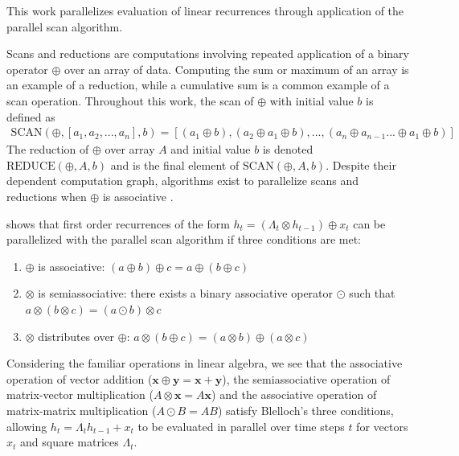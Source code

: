 \documentclass{article}
\providecommand{\scan}{\text{SCAN}}
\providecommand{\reduce}{\text{REDUCE}}
\begin{document}
  This work parallelizes evaluation of linear recurrences through application of
the parallel scan algorithm.

Scans and reductions are computations involving repeated application of a binary
operator $\oplus$ over an array of data. Computing the sum or maximum
of an array is an example of a reduction, while a cumulative sum is a common
example of a scan operation. Throughout this work, the scan of $\oplus$ with
initial value $b$ is defined as
\begin{align*}
\scan(\oplus, [a_1, a_2, ..., a_n], b) = [(a_1 \oplus b), (a_2 \oplus a_1 \oplus b), ..., (a_n \oplus a_{n-1} ... \oplus a_1 \oplus b)]
\end{align*}
The reduction of $\oplus$ over array $A$ and initial value $b$ is denoted 
$\reduce(\oplus, A, b)$ and is the final element of $\scan(\oplus, A, b)$.
Despite their dependent computation graph, algorithms exist to parallelize scans 
and reductions when $\oplus$ is associative \cite{ladner1980parallel}.

\citet{blelloch1990prefix} shows that first order recurrences of the form
$h_t = (\Lambda_t \otimes h_{t-1}) \oplus x_t$ can be parallelized with
the parallel scan algorithm if three conditions are met:

\begin{enumerate}
\item $\oplus$ is associative: $(a \oplus b) \oplus c = a \oplus (b \oplus c)$
\item $\otimes$ is semiassociative: there exists a binary associative operator
$\odot$ such that $a \otimes (b \otimes c) = (a \odot b) \otimes c$
\item $\otimes$ distributes over $\oplus$: $a\otimes(b\oplus c) = (a\otimes b) \oplus (a \otimes c)$ 
\end{enumerate}

Considering the familiar operations in linear algebra, we see that the
associative operation of vector addition
($\boldsymbol{x} \oplus \boldsymbol{y} = \boldsymbol{x} + \boldsymbol{y}$), the
semiassociative operation of matrix-vector multiplication
($A \otimes \boldsymbol{x} = A\boldsymbol{x}$) and the associative operation of
matrix-matrix multiplication ($A \odot B=AB$) satisfy Blelloch's three
conditions, allowing $h_t = \Lambda_t h_{t-1} + x_t$ to be evaluated in parallel
over time steps \(t\) for vectors $x_t$ and square matrices $\Lambda_t$.
\end{document}
